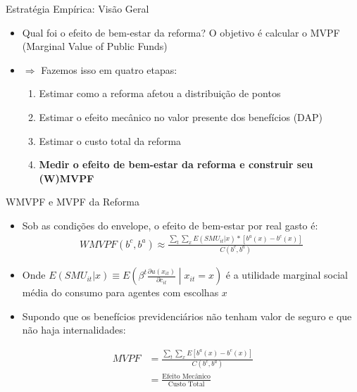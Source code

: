 \begin{frame}{Estratégia Empírica: Visão Geral}
\begin{itemize}
    \item Qual foi o efeito de bem-estar da reforma? O objetivo é calcular o MVPF (Marginal Value of Public Funds)
    \item[] $\Rightarrow$  Fazemos isso em quatro etapas:
    \begin{enumerate}
        \item Estimar como a reforma afetou a distribuição de pontos
        \item {Estimar o efeito mecânico no valor presente dos benefícios (DAP)}
        \item {Estimar o custo total da reforma}
        \item \textbf{Medir o efeito de bem-estar da reforma e construir seu (W)MVPF}
    \end{enumerate}
\end{itemize}
\end{frame}

\begin{frame}{WMVPF e MVPF da Reforma}
    \begin{itemize}
        \item Sob as condições do envelope, o efeito de bem-estar por real gasto é:
        \begin{align*}
            WMVPF(b^c,b^a)\approx \frac{\sum_t \sum_x E(SMU_{it}|x)*[b^a(x)-b^c(x)]}{C(b^c,b^a)}
        \end{align*}
        \item Onde $E(SMU_{it}|x) \equiv E\left(\beta^t \frac{\partial u(x_{it})}{\partial c_{it}} \middle| x_{it}=x\right)$ é a utilidade marginal social média do consumo para agentes com escolhas $x$
        \item Supondo que os benefícios previdenciários não tenham valor de seguro e que não haja internalidades:
    \end{itemize}
    \begin{align*}
        MVPF & = \frac{\sum_t \sum_x E[b^a(x)-b^c(x)]}{C(b^c,b^a)} \\
        & = \frac{\text{Efeito Mecânico}}{\text{Custo Total}}
    \end{align*}
\end{frame}

